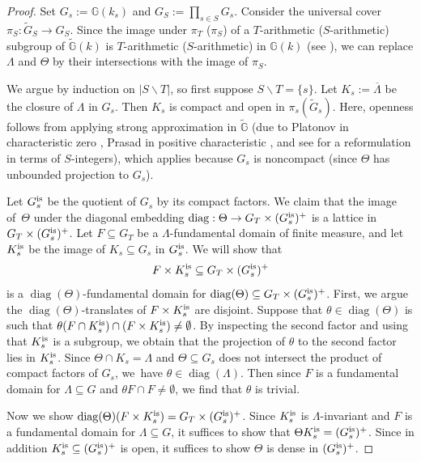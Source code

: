 \documentclass[JEP,XML,SOM,Unicode,published]{cedram}
\let\bs\backslash
\newcommand{\bbG}{\ensuremath{\mathbb{G}}}
\DeclareMathOperator{\diag}{diag}
\theoremstyle{definition}
\begin{document}
\begin{proof} Set $G_s:=\bbG(k_s)$ and $G_S:=\prod_{s\in S} G_s$. Consider the universal cover $\pi_S:\widetilde{G}_S\to G_S$. Since the image under $\pi_T$ (\resp $\pi_S$) of a $T$-arithmetic (\resp $S$\nobreakdash-arith\-metic) subgroup of $\widetilde{\bbG}(k)$ is $T$-arithmetic (\resp $S$-arithmetic) in $\bbG(k)$ (see \eg \cite[I.3.2.9]{margulis-book}), we can replace $\Lambda$ and $\Theta$ by their intersections with the image of $\pi_S$.

We argue by induction on $|S\bs T|$, so first suppose $S\bs T=\{s\}$. Let $K_s:=\overline{\Lambda}$ be the closure of $\Lambda$ in $G_s$. Then $K_s$ is compact and open in $\pi_s(\widetilde{G}_s)$. Here, openness follows from applying strong approximation in $\widetilde{\bbG}$ (due to Platonov in characteristic zero \cite{platonov-strongapprox}, Prasad in positive characteristic \cite{prasad-strongapprox}, and see \cite[Prop.\,7.2(2)]{platonov-rapinchuk-book} for a reformulation in terms of $S$-integers), which applies because $G_s$ is noncompact (since $\Theta$ has unbounded projection to $G_s$).

Let $G_s^{\textup{is}}$ be the quotient of $G_s$ by its compact factors. We claim that the image of~$\Theta$ under the diagonal embedding $\diag:\Theta\to G_T \times (G_s^{\textup{is}})^+$ is a lattice in $G_T\times (G_s^{\textup{is}})^+$. Let $F\subseteq G_T$ be a $\Lambda$-fundamental domain of finite measure, and let $K_s^{\textup{is}}$ be the image of $K_s\subseteq G_s$ in $G_s^{\textup{is}}$. We will show that
\[
F\times K_s^{\textup{is}}\subseteq G_T\times (G_s^{\textup{is}})^+
\]
is a $\diag(\Theta)$-fundamental domain for $\diag(\Theta)\subseteq G_T\times (G_s^{\textup{is}})^+$. First, we argue the $\diag(\Theta)$-translates of $F\times K_s^{\textup{is}}$ are disjoint. Suppose that $\theta\in\diag(\Theta)$ is such that $\theta(F\cap K_s^{\textup{is}}) \cap (F\times K_s^{\textup{is}})\neq \emptyset$. By inspecting the second factor and using that $K_s^{\textup{is}}$ is a subgroup, we obtain that the projection of $\theta$ to the second factor lies in $K_s^{\textup{is}}$. Since $\Theta\cap K_s=\Lambda$ and $\Theta\subseteq G_s$ does not intersect the product of compact factors of $G_s$, we~have $\theta\in\diag(\Lambda)$. Then since $F$ is a fundamental domain for $\Lambda\subseteq G$ and $\theta F\cap F\neq\emptyset$, we find that $\theta$ is trivial.

Now we show $\diag(\Theta)(F\times K_s^{\textup{is}})=G_T\times (G_s^{\textup{is}})^+$. Since $K_s^{\textup{is}}$ is $\Lambda$-invariant and $F$ is a fundamental domain for $\Lambda\subseteq G$, it suffices to show that $\Theta K_s^{\textup{is}}= (G_s^{\textup{is}})^+$. Since in addition $K_s^{\textup{is}}\subseteq (G_s^{\textup{is}})^+$ is open, it suffices to show $\Theta$ is dense in $(G_s^{\textup{is}})^+$.


\end{proof}
\end{document}
